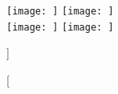 
\begin{figure}[H]
\centering
	\subcaptionbox%
	[]%
	{\label{subfig:}}%
		{\texttt{[image: ]}}%
\hfill
	\subcaptionbox%
		[]%
		{\label{subfig:}}%
		{\texttt{[image: ]}}%
\\[\vbtwsfig]
	\subcaptionbox%
		[]%
		{\label{subfig:}}%
		{\texttt{[image: ]}}%
\hfill
	\subcaptionbox%
		[]%
		{\label{subfig:}}%
		{\texttt{[image: ]}}%
\caption%
[]%
{}
\label{fig:}
\end{figure}
